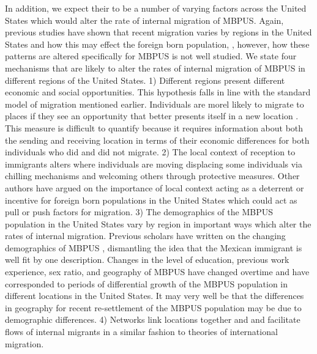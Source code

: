 \documentclass[fleqn,12pt]{olplainarticle}
\begin{document}
In addition, we expect their to be a number of varying factors across the United States which would alter the rate of internal migration of MBPUS.
Again, previous studies have shown that recent migration varies by regions in the United States \citep{ Molloy2011a} and how this may effect the foreign born population, \citep{Ellis2016, Lichter2009}, however, how these patterns are altered specifically for MBPUS is not well studied. 
We state four mechanisms that are likely to alter the rates of internal migration of MBPUS in different regions of the United States. 
1) Different regions present different economic and social opportunities. This hypothesis falls in line with the standard model of migration mentioned earlier. Individuals are morel likely to migrate to places if they see an opportunity that better presents itself in a new location  \citep{ Ellis2014}.
This measure is difficult to quantify because it requires information about both the sending and receiving location in terms of their economic differences for both individuals who did and did not migrate. 
2) The local context of reception to immigrants alters where individuals are moving displacing some individuals via chilling mechanisms and welcoming others through protective measures.
Other authors have argued on the importance of local context acting as a deterrent  \citep{ Ellis2016} or incentive  \citep{Jaworsky2012} for foreign born populations in the United States which could act as pull or push factors for migration. 
3) The demographics of the MBPUS population in the United States vary by region in important ways which alter the rates of internal migration. Previous scholars have written on the changing demographics of MBPUS  \citep{ Garip2016,  Riosmena2012}, dismantling the idea that the Mexican immigrant is well fit by one description. 
Changes in the level of education, previous work experience, sex ratio, and geography of MBPUS have changed overtime  \citep{ Garip2016} and have corresponded to periods of differential growth of the MBPUS population in different locations in the United States.
It may very well be that the differences in geography for recent re-settlement of the MBPUS population may be due to demographic differences.
4) Networks link locations together and and facilitate flows of internal migrants in a similar fashion to theories of international migration.
\end{document}
